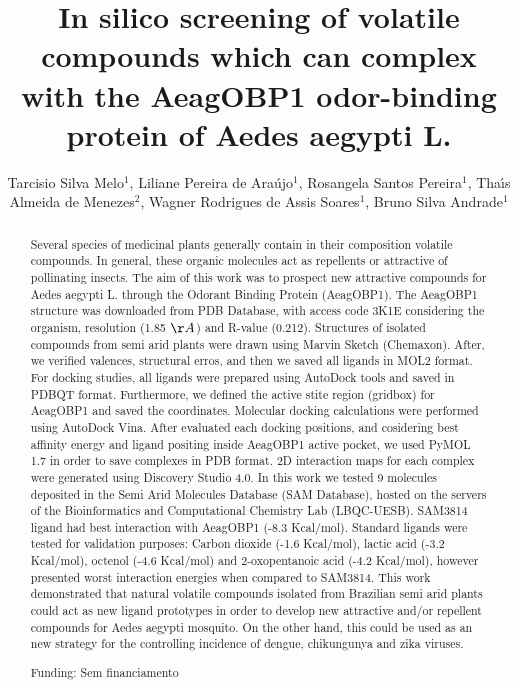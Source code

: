 \documentclass[twoside]{article}
\title{\vspace{-15mm}\fontsize{24pt}{10pt}\selectfont\textbf{In silico screening of volatile compounds which can complex with the AeagOBP1 odor-binding protein of Aedes aegypti L.}} %
\author{Tarcisio Silva Melo$^1$, Liliane Pereira de Ara\'ujo$^1$, Rosangela Santos Pereira$^1$, Tha\'{\i}s Almeida de Menezes$^2$, Wagner Rodrigues de Assis Soares$^1$, Bruno Silva Andrade$^1$}
\affil{1 UNIVERSIDADE ESTADUAL DO SUDOESTE DA BAHIA\\ 2 UNIVERSIDADE ESTADUAL DE FEIRA DE SANTANA\\ }
\date{}
\begin{document}
\maketitle %

\thispagestyle{fancy} %


\begin{abstract}
Several species of medicinal plants generally contain in their composition volatile compounds. In general, these organic molecules act as repellents or attractive of pollinating insects. The aim of this work was to prospect new attractive compounds for Aedes aegypti L. through the Odorant Binding Protein (AeagOBP1). The AeagOBP1 structure was downloaded from PDB Database, with access code 3K1E considering the organism, resolution (1.85 $\AA$) and R-value (0.212). Structures of isolated compounds from semi arid plants were drawn using Marvin Sketch (Chemaxon). After, we verified valences, structural erros, and then we saved all ligands in MOL2 format. For docking studies, all ligands were prepared using AutoDock tools and saved in PDBQT format. Furthermore, we defined the active stite region (gridbox) for AeagOBP1 and saved the coordinates. Molecular docking calculations were performed using AutoDock Vina. After evaluated each docking positions, and cosidering best affinity energy and ligand positing inside AeagOBP1 active pocket, we used PyMOL 1.7 in order to save complexes in PDB format. 2D interaction maps for each complex were generated using Discovery Studio 4.0. In this work we tested 9 molecules deposited in the Semi Arid Molecules Database (SAM Database), hosted on the servers of the Bioinformatics and Computational Chemistry Lab (LBQC-UESB). SAM3814 ligand had best interaction with AeagOBP1 (-8.3 Kcal/mol). Standard ligands were tested for validation purposes: Carbon dioxide (-1.6 Kcal/mol), lactic acid (-3.2 Kcal/mol), octenol (-4.6 Kcal/mol) and 2-oxopentanoic acid (-4.2 Kcal/mol), however presented worst interaction energies when compared to SAM3814.  This work demonstrated that natural volatile compounds isolated from Brazilian semi arid plants could act as new ligand prototypes in order to develop new attractive and/or repellent compounds for Aedes aegypti mosquito. On the other hand, this could be used as an new strategy for the controlling incidence of dengue, chikungunya and zika viruses.

Funding: Sem financiamento
\end{abstract}
\end{document}
